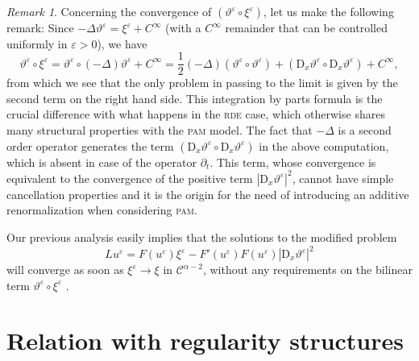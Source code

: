 \documentclass[a4paper,11pt]{article}
\newcommand{\mathD}{\mathrm{D}}
\theoremstyle{remark}
\newtheorem{remark}[theorem]{Remark}
\newcommand{\CC}{\ensuremath{\mathscr{C}}}
\newcommand{\reso}{\,\mathord{\circ}\,}
\begin{document}
\begin{remark}
Concerning the convergence of $( \vartheta^{\varepsilon} \reso
\xi^{\varepsilon} )$, let us make the following remark: Since $-\Delta \vartheta^{\varepsilon} = \xi^{\varepsilon} +C^\infty$ (with a $C^\infty$ remainder that can be controlled uniformly in $\varepsilon > 0$), we have
\[
   \vartheta^{\varepsilon} \reso \xi^{\varepsilon} = \vartheta^{\varepsilon} \reso (-\Delta) \vartheta^{\varepsilon} + C^\infty = \frac{1}{2} (-\Delta) ( \vartheta^{\varepsilon} \reso   \vartheta^{\varepsilon} ) + (\mathD_{x} \vartheta^{\varepsilon} \reso \mathD_{x}  \vartheta^{\varepsilon} ) + C^\infty,
\]
from which we see that the only problem in passing to the limit is given by
the second term on the right hand side. This integration by parts formula is the crucial difference with what happens in the \textsc{rde} case, which otherwise shares many structural properties with the \textsc{pam} model. The fact that $-\Delta$ is a second order operator generates the term $(\mathD_{x} \vartheta^{\varepsilon} \reso \mathD_{x}  \vartheta^{\varepsilon} )$ in the above computation, which is absent in case of the operator $\partial_t$. This term, whose convergence is equivalent to the convergence of the positive term $|\mathD_x \vartheta^\varepsilon|^2$, cannot have simple cancellation properties and it is the origin for the need of introducing an additive renormalization when considering \textsc{pam}.

Our previous analysis easily implies  that the solutions to the modified
problem
\[
   L u^{\varepsilon} =F ( u^{\varepsilon} ) \xi^{\varepsilon} - F'( u^{\varepsilon} ) F (u^{\varepsilon} ) | \mathD_{x} \vartheta^{\varepsilon}  |^2
\]
will converge as soon as $\xi^{\varepsilon} \rightarrow \xi$ in $\CC^{\alpha
-2}$, without any requirements on the bilinear term $\vartheta^{\varepsilon} \reso
\xi^{\varepsilon}$ . 

\end{remark}




\section{Relation with regularity structures}\label{sec:regularity}
\end{document}
